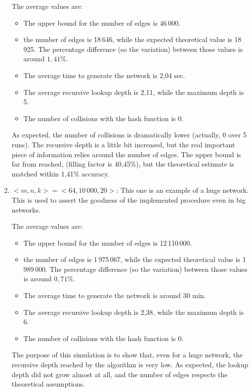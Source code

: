 \documentclass[11pt, a4paper]{report}
\begin{document}
\begin{enumerate}
		\par
		The average values are:
		\begin{itemize}
			\item The upper bound for the number of edges is 46\,000.
			\item the number of edges is 18\,646, while the expected theoretical value is 18\,925. The percentage difference (so the variation) between those values is around $1,41\%$.
			\item The average time to generate the network is 2,04 sec.
			\item The average recursive lookup depth is 2,11, while the maximum depth is 5.
			\item The number of collisions with the hash function is 0.
		\end{itemize}
		As expected, the number of collisions is dramatically lower (actually, 0  over 5 runs). The recursive depth is a little bit increased, but the real important piece of information relies around the number of edges. The upper bound is far from reached, (filling factor is 40,45\%), but the theoretical estimate is matched within 1,41\% accuracy. 
		\item $<\!m, n, k\!> = <\!64, 10\,000, 20\!>$: This one is an example of a huge network. This is used to assert the goodness of the implemented procedure even in big networks. 
		\par
		The average values are:
		\begin{itemize}
			\item The upper bound for the number of edges is 12\,110\,000.
			\item the number of edges is 1\,975\,067, while the expected theoretical value is 1\,989\,000. The percentage difference (so the variation) between those values is around $0,71\%$.
			\item The average time to generate the network is around 30 min.
			\item The average recursive lookup depth is 2,38, while the maximum depth is 6.
			\item The number of collisions with the hash function is 0.
		\end{itemize}
		The purpose of this simulation is to show that, even for a huge network, the recursive depth reached by the algorithm is very low. As expected, the lookup depth did not grow almost at all, and the number of edges respects the theoretical assumptions.
	\end{enumerate}
\end{document}
